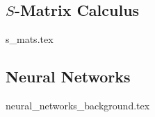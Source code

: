 \subsection{$S$-Matrix Calculus} \label{sec:s_mats}
{s_mats.tex}


\subsection{Neural Networks} \label{sec:NN_bg}
{neural_networks_background.tex}
